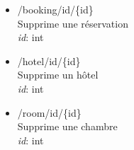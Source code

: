 \documentclass{article}
\begin{document}
\begin{itemize}
\begin{itemize}
		\item /booking/id/\{id\}\\
		Supprime une r\'eservation \\
		\textit{id}: int


		\item /hotel/id/\{id\}\\
		Supprime un h\^{o}tel \\
		\textit{id}: int



	\item /room/id/\{id\}\\
		Supprime une chambre \\
		\textit{id}: int

\end{itemize}
\end{itemize}
\end{document}
